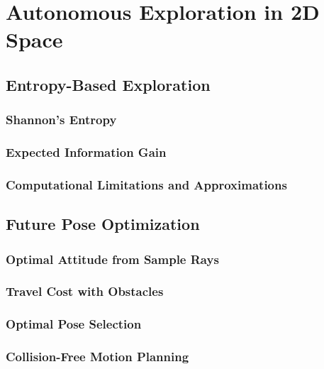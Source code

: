 
\chapter{Autonomous Exploration in 2D Space} \label{chap:ae2D}

\section{Entropy-Based Exploration}

\subsection{Shannon's Entropy}

\subsection{Expected Information Gain}

\subsection{Computational Limitations and Approximations}

\section{Future Pose Optimization}

\subsection{Optimal Attitude from Sample Rays}

\subsection{Travel Cost with Obstacles}

\subsection{Optimal Pose Selection}

\subsection{Collision-Free Motion Planning}

